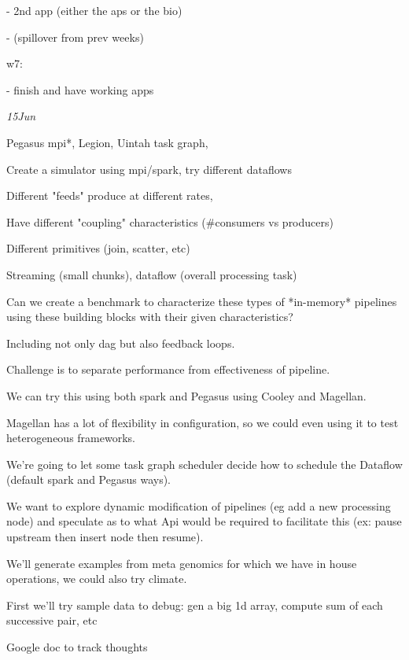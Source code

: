 - 2nd app (either the aps or the bio)

- (spillover from prev weeks)

w7:

- finish and have working apps

\emph{15Jun}

Pegasus mpi*, Legion, Uintah task graph,

Create a simulator using mpi/spark, try different dataflows

Different "feeds" produce at different rates,

Have different "coupling" characteristics (\#consumers vs producers)

Different primitives (join, scatter, etc)

Streaming (small chunks), dataflow (overall processing task)

Can we create a benchmark to characterize these types of *in-memory*
pipelines using these building blocks with their given characteristics?

Including not only dag but also feedback loops.

Challenge is to separate performance from effectiveness of pipeline.

We can try this using both spark and Pegasus using Cooley and Magellan.

Magellan has a lot of flexibility in configuration, so we could even
using it to test heterogeneous frameworks.

We're going to let some task graph scheduler decide how to schedule the
Dataflow (default spark and Pegasus ways).

We want to explore dynamic modification of pipelines (eg add a new
processing node) and speculate as to what Api would be required to
facilitate this (ex: pause upstream then insert node then resume).

We'll generate examples from meta genomics for which we have in house
operations, we could also try climate.

First we'll try sample data to debug: gen a big 1d array, compute sum of
each successive pair, etc

Google doc to track thoughts
